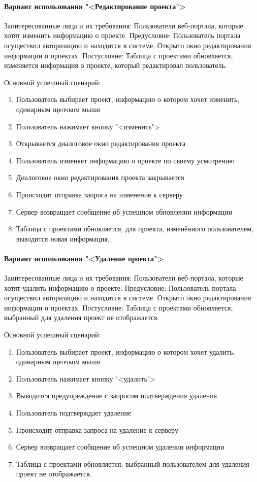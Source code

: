\paragraph{Вариант использования "<Редактирование проекта">}
Заинтересованные лица и их требования: Пользователи веб-портала, которые хотят изменить информацию о проекте.
Предусловие: Пользователь портала осуществил авторизацию и находится в системе. Открыто окно редактирования информации о проектах.
Постусловие: Таблица с проектами обновляется, изменяется информация о проекте, который редактировал пользователь.

Основной успешный сценарий:
\begin{enumerate}
	\item Пользователь выбирает проект, информацию о котором хочет изменить, одинарным щелчком мыши
	\item Пользователь нажимает кнопку "<изменить">
	\item Открывается диалоговое окно редактирования проекта
	\item Пользователь изменяет информацию о проекте по своему усмотрению
	\item Диалоговое окно редактирования проекта закрывается
	\item Происходит отправка запроса на изменение к серверу 
	\item Сервер возвращает сообщение об успешном обновлении информации
	\item Таблица с проектами обновляется, для проекта, изменённого пользователем, выводится новая информация.
\end{enumerate}

\paragraph{Вариант использования "<Удаление проекта">}
Заинтересованные лица и их требования: Пользователи веб-портала, которые хотят удалить информацию о проекте.
Предусловие: Пользователь портала осуществил авторизацию и находится в системе. Открыто окно редактирования информации о проектах.
Постусловие: Таблица с проектами обновляется, выбранный для удаления проект не отображается.

Основной успешный сценарий:
\begin{enumerate}
	\item Пользователь выбирает проект, информацию о котором хочет удалить, одинарным щелчком мыши
	\item Пользователь нажимает кнопку "<удалить">
	\item Выводится предупреждение с запросом подтверждения удаления
	\item Пользователь подтверждает удаление
	\item Происходит отправка запроса на удаление к серверу 
	\item Сервер возвращает сообщение об успешном удалении информации
	\item Таблица с проектами обновляется, выбранный пользователем для удаления проект не отображается.
\end{enumerate}

